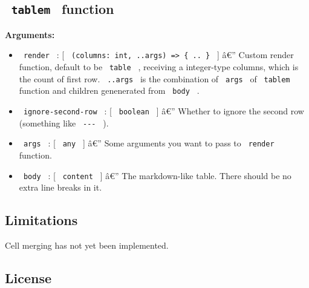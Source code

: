 
\subsection{\texorpdfstring{\texttt{\ tablem\ }
function}{ tablem  function}}\label{tablem-function}

\begin{Shaded}
\begin{Highlighting}[]
\end{Highlighting}
\end{Shaded}

\textbf{Arguments:}

\begin{itemize}
\tightlist
\item
  \texttt{\ render\ } : {[}
  \texttt{\ (columns:\ int,\ ..args)\ =\textgreater{}\ \{\ ..\ \}\ } {]}
  â€'' Custom render function, default to be \texttt{\ table\ } ,
  receiving a integer-type columns, which is the count of first row.
  \texttt{\ ..args\ } is the combination of \texttt{\ args\ } of
  \texttt{\ tablem\ } function and children genenerated from
  \texttt{\ body\ } .
\item
  \texttt{\ ignore-second-row\ } : {[} \texttt{\ boolean\ } {]} â€''
  Whether to ignore the second row (something like
  \texttt{\ \textbar{}-\/-\/-\textbar{}\ } ).
\item
  \texttt{\ args\ } : {[} \texttt{\ any\ } {]} â€'' Some arguments you
  want to pass to \texttt{\ render\ } function.
\item
  \texttt{\ body\ } : {[} \texttt{\ content\ } {]} â€'' The
  markdown-like table. There should be no extra line breaks in it.
\end{itemize}

\subsection{Limitations}\label{limitations}

Cell merging has not yet been implemented.

\subsection{License}\label{license}

